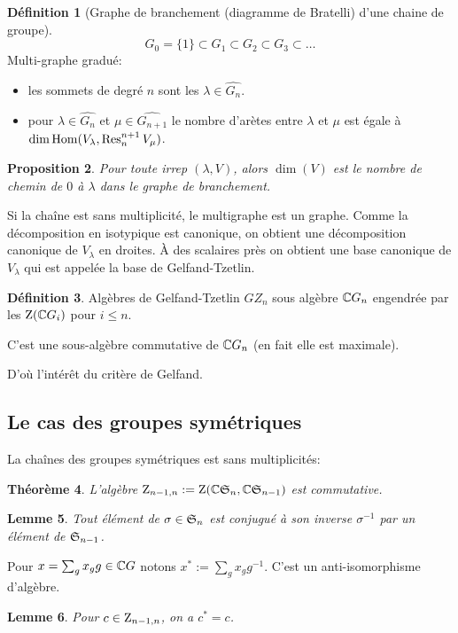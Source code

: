 \documentclass[francais,a4paper,11pt,reqno]{amsart}
\theoremstyle{plain}
\newtheorem{THEO}{\bf Théorème}[section]
\newtheorem{PROP}[THEO]{\bf Proposition}
\newtheorem{LEMME}[THEO]{\bf Lemme}
\theoremstyle{definition}
\newtheorem{DEF}[THEO]{\bf Définition}
\theoremstyle{remark}
\begin{document}
\begin{DEF}[Graphe de branchement (diagramme de Bratelli) d'une chaine de
  groupe]
  \begin{equation}
    G_0=\{1\} \subset G_1 \subset G_2 \subset G_3 \subset \dots
  \end{equation}
  Multi-graphe gradué:
  \begin{itemize}
  \item les sommets de degré $n$ sont les $\lambda\in\hat{G_n}$.
  \item pour $\lambda\in\hat{G_n}$ et $\mu\in\hat{G_{n+1}}$ le nombre d'arètes
    entre $\lambda$ et $\mu$ est égale à $\dim\operatorname{Hom}(V_\lambda, \operatorname{Res}^{n+1}_nV_\mu)$.
  \end{itemize}
\end{DEF}
\begin{PROP}
  Pour toute irrep $(\lambda, V)$, alors $\dim(V)$ est le nombre de chemin de $0$
  à $\lambda$ dans le graphe de branchement.
\end{PROP}
Si la chaîne est sans multiplicité, le multigraphe est un graphe. Comme la
décomposition en isotypique est canonique, on obtient une décomposition
canonique de $V_\lambda$ en droites. À des scalaires près on obtient une base
canonique de $V_\lambda$ qui est appelée la base de Gelfand-Tzetlin.
\begin{DEF}
  Algèbres de Gelfand-Tzetlin $GZ_n$ sous algèbre ${\mathbb C} G_n$ engendrée par
  les $\operatorname{Z}({\mathbb C} G_i)$ pour $i\leq n$.
\end{DEF}
C'est une sous-algèbre commutative de ${\mathbb C} G_n$ (en fait elle est maximale).

D'où l'intérêt du critère de Gelfand.

\subsection{Le cas des groupes symétriques}

La chaînes des groupes symétriques est sans multiplicités:
\begin{THEO}
  L'algèbre $\operatorname{Z}_{n-1,n} := \operatorname{Z}({\mathbb C} {\mathfrak S}_n, {\mathbb C} {\mathfrak S}_{n-1})$ est commutative.
\end{THEO}
\begin{LEMME}
  Tout élément de $\sigma\in{\mathfrak S}_n$ est conjugué à son inverse $\sigma^{-1}$
  par un élément de ${\mathfrak S}_{n-1}$.
\end{LEMME}
Pour $x=\sum_g x_g g\in{\mathbb C} G$ notons $x^* := \sum_g x_g g^{-1}$. C'est un
anti-isomorphisme d'algèbre.
\begin{LEMME}
  Pour $c\in\operatorname{Z}_{n-1,n}$, on a $c^* = c$.
\end{LEMME}
\end{document}
